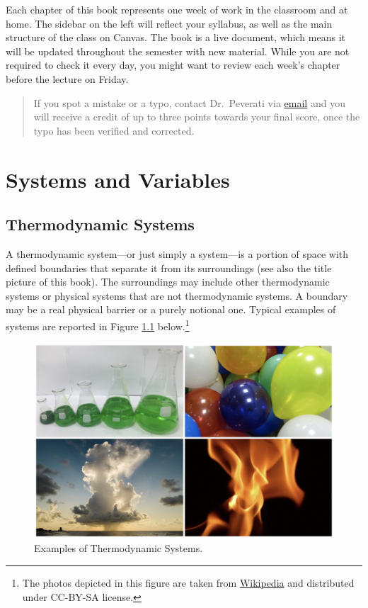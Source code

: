 \documentclass[
  9pt,
]{extbook}
\theoremstyle{definition}
\theoremstyle{definition}
\theoremstyle{definition}
\theoremstyle{remark}
\begin{document}
Each chapter of this book represents one week of work in the classroom and at home. The sidebar on the left will reflect your syllabus, as well as the main structure of the class on Canvas. The book is a live document, which means it will be updated throughout the semester with new material. While you are not required to check it every day, you might want to review each week's chapter before the lecture on Friday.

\begin{quote}
If you spot a mistake or a typo, contact Dr.~Peverati via \href{mailto:rpeverati@fit.edu}{email} and you will receive a credit of up to three points towards your final score, once the typo has been verified and corrected.
\end{quote}

\cleardoublepage
{}

\hypertarget{SystemVariables}{%
\chapter{Systems and Variables}\label{SystemVariables}}

\hypertarget{thermodynamic-systems}{%
\section{Thermodynamic Systems}\label{thermodynamic-systems}}

A thermodynamic system---or just simply a system---is a portion of space with defined boundaries that separate it from its surroundings (see also the title picture of this book). The surroundings may include other thermodynamic systems or physical systems that are not thermodynamic systems. A boundary may be a real physical barrier or a purely notional one. Typical examples of systems are reported in Figure \ref{fig:Fig1c1} below.\footnote{The photos depicted in this figure are taken from \href{https://en.wikipedia.org}{Wikipedia} and distributed under CC-BY-SA license.}

\begin{figure}

{\centering \includegraphics[width=0.7\linewidth]{./img/OEP_Figures.001} 

}

\caption{Examples of Thermodynamic Systems.}\label{fig:Fig1c1}
\end{figure}
\end{document}
